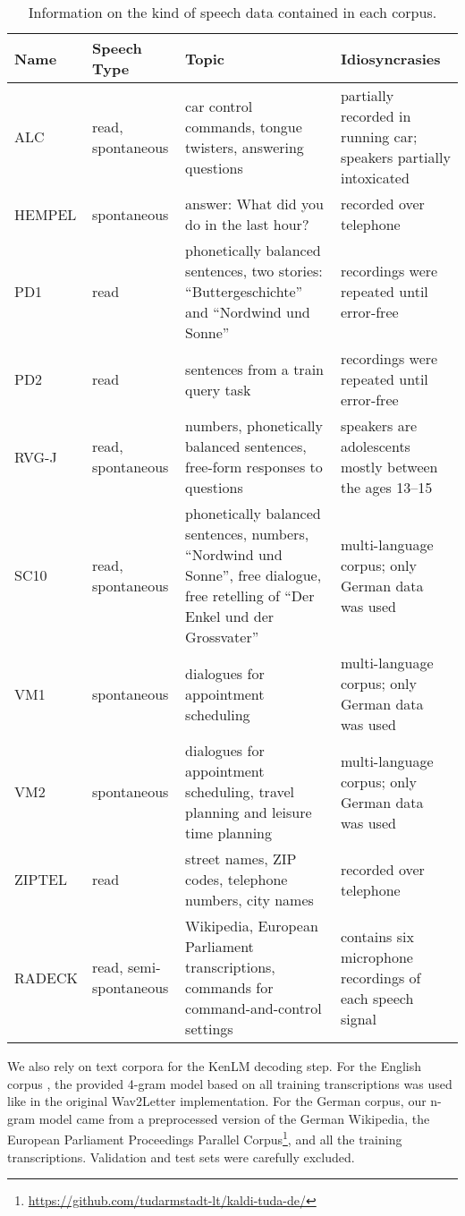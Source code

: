 \documentclass[11pt,a4paper]{article}
\begin{document}
\begin{table*}
\centering
{\footnotesize
\begin{tabularx}{\textwidth}{l l X X}
\toprule
Name & Speech Type & Topic & Idiosyncrasies \\
\midrule
ALC & read, spontaneous & car control commands, tongue twisters, answering questions & partially recorded in running car; speakers partially intoxicated \\
HEMPEL & spontaneous & answer: What did you do in the last hour? & recorded over telephone \\
PD1 & read & phonetically balanced sentences, two stories: ``Buttergeschichte'' and ``Nordwind und Sonne'' & recordings were repeated until error-free \\
PD2 & read & sentences from a train query task & recordings were repeated until error-free \\
RVG-J & read, spontaneous & numbers, phonetically balanced sentences, free-form responses to questions & speakers are adolescents mostly between the ages 13--15 \\
SC10 & read, spontaneous & phonetically balanced sentences, numbers, ``Nordwind und Sonne'', free dialogue, free retelling of ``Der Enkel und der Grossvater'' & multi-language corpus; only German data was used \\
VM1 & spontaneous & dialogues for appointment scheduling & multi-language corpus; only German data was used \\
VM2 & spontaneous & dialogues for appointment scheduling, travel planning and leisure time planning & multi-language corpus; only German data was used \\
ZIPTEL & read & street names, ZIP codes, telephone numbers, city names & recorded over telephone \\
RADECK & read, semi-spontaneous & Wikipedia, European Parliament transcriptions, commands for command-and-control settings & contains six microphone recordings of each speech signal \\
\bottomrule
\end{tabularx}
}
\caption{Information on the kind of speech data contained in each corpus.}
\label{table_corpora_speechinfo}
\end{table*}

We also rely on text corpora for the KenLM decoding step.
For the English corpus \cite{panayotov_librispeech_2015}, the provided 4-gram model based on all training transcriptions was used like in the original Wav2Letter implementation.
For the German corpus, our n-gram model came from a preprocessed version of the German Wikipedia, the European Parliament Proceedings Parallel Corpus\footnote{\href{https://github.com/tudarmstadt-lt/kaldi-tuda-de/}{https://github.com/tudarmstadt-lt/kaldi-tuda-de/}}, and all the training transcriptions.
Validation and test sets were carefully excluded.
\end{document}
